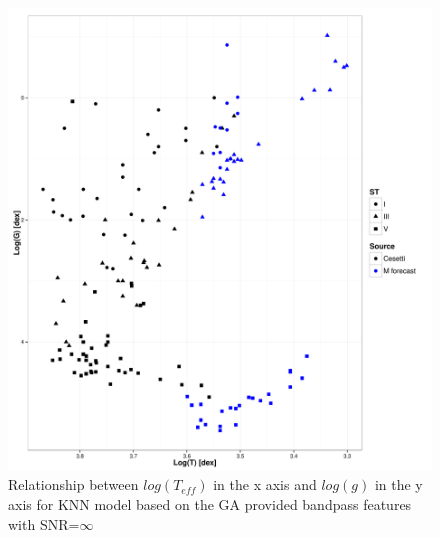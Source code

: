 \begin{figure}
 \begin{center}
 \includegraphics[width=12cm]{figs/irtf-logg-knn-oo.pdf}
 \caption{Relationship between $log(T_{eff}) $ in the x axis 
 and $log(g)$ in the y axis for KNN model based on the GA provided bandpass features with SNR=$\infty$}
 \label{fig:lt_lg_ga}
 \end{center}
\end{figure}

